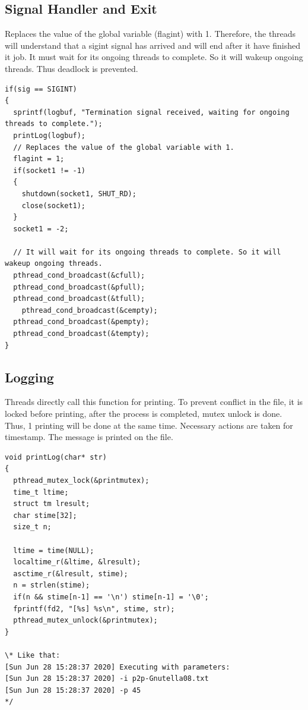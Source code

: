 \documentclass{article}
\begin{document}
\subsection{Signal Handler and Exit}

\noindent Replaces the value of the global variable (flagint) with 1. Therefore, the threads will understand that a sigint signal has arrived and will end after it have finished it job. It must wait for its ongoing threads to complete. So it will wakeup ongoing threads. Thus deadlock is prevented.
\begin{lstlisting}[style=CStyle]
if(sig == SIGINT)
{
  sprintf(logbuf, "Termination signal received, waiting for ongoing threads to complete.");
  printLog(logbuf);
  // Replaces the value of the global variable with 1.
  flagint = 1;
  if(socket1 != -1)
  {
    shutdown(socket1, SHUT_RD);
    close(socket1);
  }
  socket1 = -2;

  // It will wait for its ongoing threads to complete. So it will wakeup ongoing threads.
  pthread_cond_broadcast(&cfull);
  pthread_cond_broadcast(&pfull);
  pthread_cond_broadcast(&tfull);
    pthread_cond_broadcast(&cempty);
  pthread_cond_broadcast(&pempty);
  pthread_cond_broadcast(&tempty);
}
\end{lstlisting}

\subsection{Logging}

\noindent Threads directly call this function for printing. To prevent conflict in the file, it is locked before printing, after the process is completed, mutex unlock is done. Thus, 1 printing will be done at the same time. Necessary actions are taken for timestamp. The message is printed on the file.
\begin{lstlisting}[style=CStyle]
void printLog(char* str)
{
  pthread_mutex_lock(&printmutex);
  time_t ltime;
  struct tm lresult;
  char stime[32];
  size_t n;

  ltime = time(NULL);
  localtime_r(&ltime, &lresult);
  asctime_r(&lresult, stime);
  n = strlen(stime);
  if(n && stime[n-1] == '\n') stime[n-1] = '\0';
  fprintf(fd2, "[%s] %s\n", stime, str);
  pthread_mutex_unlock(&printmutex);
}

\* Like that:
[Sun Jun 28 15:28:37 2020] Executing with parameters:
[Sun Jun 28 15:28:37 2020] -i p2p-Gnutella08.txt
[Sun Jun 28 15:28:37 2020] -p 45
*/
\end{lstlisting}
\end{document}
